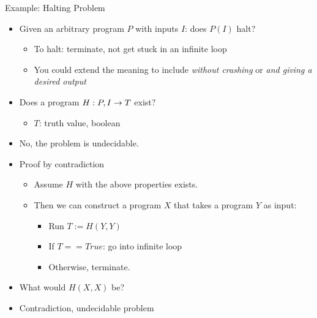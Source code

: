 \begin{frame}{Example: Halting Problem}
%
\begin{itemize}
\item Given an arbitrary program $P$ with inputs $I$: does $P(I)$ halt?
	\begin{itemize}
	\item To halt: terminate, \ie not get stuck in an infinite loop
	\item You could extend the meaning to include \emph{without crashing} or \emph{and giving a desired output}
	\end{itemize}
\item Does a program $H: P, I \rightarrow T$ exist?
	\begin{itemize}
	\item $T$: truth value, \ie boolean
	\end{itemize}
\pause
\item No, the problem is undecidable.
\item Proof by contradiction
	\begin{itemize}
	\item Assume $H$ with the above properties exists.
	\item Then we can construct a program $X$ that takes a program $Y$ as input:
		\begin{itemize}
		\item Run $T := H(Y, Y)$
		\item If $T == True$: go into infinite loop
		\item Otherwise, terminate.
		\end{itemize}
	\end{itemize}
\item[\Thus] What would $H(X, X)$ be?
\item[\Thus] Contradiction, undecidable problem
\end{itemize}
%
\end{frame}


